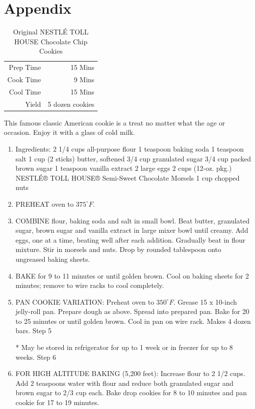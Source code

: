\documentclass[]{aiaa-tc}%
\begin{document}
\section*{Appendix}

\begin{table}%
    \begin{center}
        \caption{Original NESTLÉ TOLL HOUSE Chocolate Chip Cookies}
        \begin{tabular}{rr}
        \hline Prep Time & 15 Mins \\
        Cook Time & 9 Mins \\
        Cool Time & 15 Mins \\
        Yield & 5 dozen cookies \\
        \end{tabular}
    \end{center}
\end{table}

This famous classic American cookie is a treat no matter what the age or occasion.  
Enjoy it with a glass of cold milk.

\begin{enumerate}
\item Ingredients: 2 1/4 cups all-purpose flour 1 teaspoon baking soda 1 teaspoon salt 1 
    cup (2 sticks) butter, softened 3/4 cup granulated sugar 3/4 cup packed brown sugar 1 
    teaspoon vanilla extract 2 large eggs 2 cups (12-oz. pkg.) NESTLÉ® TOLL HOUSE® 
    Semi-Sweet Chocolate Morsels 1 cup chopped nuts 

\item PREHEAT oven to $375^\circ F$.

\item COMBINE flour, baking soda and salt in small bowl. Beat butter, granulated sugar, brown sugar and vanilla extract in large mixer bowl until creamy. Add eggs, one at a time, beating well after each addition. Gradually beat in flour mixture. Stir in morsels and nuts. Drop by rounded tablespoon onto ungreased baking sheets.

\item BAKE for 9 to 11 minutes or until golden brown. Cool on baking sheets for 2 minutes; remove to wire racks to cool completely.

\item PAN COOKIE VARIATION: Preheat oven to $350^\circ F$.  Grease 15 x 10-inch jelly-roll pan. Prepare dough as above. Spread into prepared pan. Bake for 20 to 25 minutes or 
until golden brown. Cool in pan on wire rack. Makes 4 dozen bars.
Step 5

* May be stored in refrigerator for up to 1 week or in freezer for up to 8 weeks.
Step 6

\item FOR HIGH ALTITUDE BAKING (5,200 feet):  Increase flour to 2 1/2 cups. Add 2 teaspoons water with flour and reduce both granulated sugar and brown sugar to 2/3 cup each. Bake drop cookies for 8 to 10 minutes and pan cookie for 17 to 19 minutes.

\end{enumerate}
\end{document}
